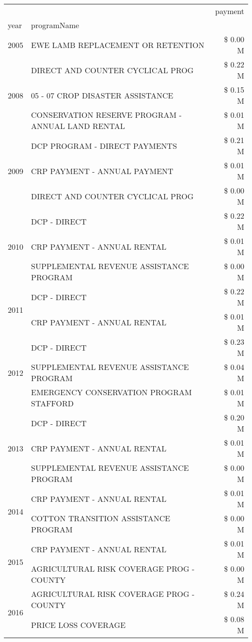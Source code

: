 \begin{tabular}{llr}
\toprule
 &  & payment \\
year & programName &  \\
\midrule
2005 & EWE LAMB REPLACEMENT OR RETENTION & \$ 0.00 M \\
\cline{1-3}
\multirow[t]{3}{*}{2008} & DIRECT AND COUNTER CYCLICAL PROG & \$ 0.22 M \\
 & 05 - 07 CROP DISASTER ASSISTANCE & \$ 0.15 M \\
 & CONSERVATION RESERVE PROGRAM - ANNUAL LAND RENTAL & \$ 0.01 M \\
\cline{1-3}
\multirow[t]{3}{*}{2009} & DCP PROGRAM - DIRECT PAYMENTS & \$ 0.21 M \\
 & CRP PAYMENT - ANNUAL PAYMENT & \$ 0.01 M \\
 & DIRECT AND COUNTER CYCLICAL PROG & \$ 0.00 M \\
\cline{1-3}
\multirow[t]{3}{*}{2010} & DCP - DIRECT & \$ 0.22 M \\
 & CRP PAYMENT - ANNUAL RENTAL & \$ 0.01 M \\
 & SUPPLEMENTAL REVENUE ASSISTANCE PROGRAM & \$ 0.00 M \\
\cline{1-3}
\multirow[t]{2}{*}{2011} & DCP - DIRECT & \$ 0.22 M \\
 & CRP PAYMENT - ANNUAL RENTAL & \$ 0.01 M \\
\cline{1-3}
\multirow[t]{3}{*}{2012} & DCP - DIRECT & \$ 0.23 M \\
 & SUPPLEMENTAL REVENUE ASSISTANCE PROGRAM & \$ 0.04 M \\
 & EMERGENCY CONSERVATION PROGRAM STAFFORD & \$ 0.01 M \\
\cline{1-3}
\multirow[t]{3}{*}{2013} & DCP - DIRECT & \$ 0.20 M \\
 & CRP PAYMENT - ANNUAL RENTAL & \$ 0.01 M \\
 & SUPPLEMENTAL REVENUE ASSISTANCE PROGRAM & \$ 0.00 M \\
\cline{1-3}
\multirow[t]{2}{*}{2014} & CRP PAYMENT - ANNUAL RENTAL & \$ 0.01 M \\
 & COTTON TRANSITION ASSISTANCE PROGRAM & \$ 0.00 M \\
\cline{1-3}
\multirow[t]{2}{*}{2015} & CRP PAYMENT - ANNUAL RENTAL & \$ 0.01 M \\
 & AGRICULTURAL RISK COVERAGE PROG - COUNTY & \$ 0.00 M \\
\cline{1-3}
\multirow[t]{3}{*}{2016} & AGRICULTURAL RISK COVERAGE PROG - COUNTY & \$ 0.24 M \\
 & PRICE LOSS COVERAGE & \$ 0.08 M \\

\end{tabular}
